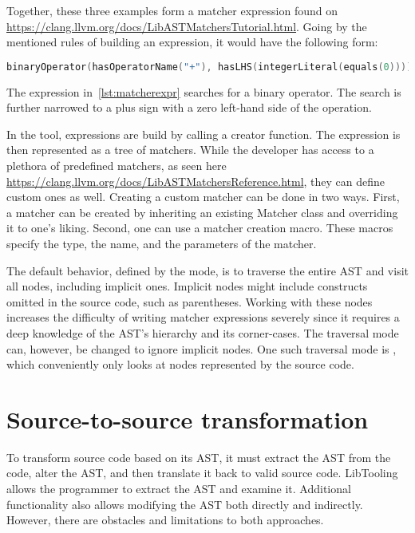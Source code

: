 Together, these three examples form a matcher expression found on 
\url{https://clang.llvm.org/docs/LibASTMatchersTutorial.html}. 
Going by the mentioned rules of building an expression, it would have 
the following form: 

\begin{lstlisting}[caption=Matcher expression., language=C++, 
label={lst:matcherexpr}, numbers=none]
binaryOperator(hasOperatorName("+"), hasLHS(integerLiteral(equals(0)))).
\end{lstlisting}

The expression in~\ref{lst:matcherexpr} searches for a binary operator. 
The search is further narrowed to a plus sign with a zero left-hand 
side of the operation.

In the tool, expressions are build by calling a creator function. 
The expression is then represented as a tree of matchers. 
While the developer has access to a plethora of predefined matchers, 
as seen here \url{https://clang.llvm.org/docs/LibASTMatchersReference.html}, 
they can define custom ones as well. 
Creating a custom matcher can be done in two ways. 
First, a matcher can be created by inheriting an existing Matcher class 
and overriding it to one's liking. 
Second, one can use a matcher creation macro. 
These macros specify the type, the name, and the parameters of the matcher.

The default behavior, defined by the  mode, is to traverse 
the entire AST and visit all nodes, including implicit ones. 
Implicit nodes might include constructs omitted in the source code, 
such as parentheses. 
Working with these nodes increases the difficulty of writing matcher 
expressions severely since it requires a deep knowledge of the AST's 
hierarchy and its corner-cases. 
The traversal mode can, however, be changed to ignore implicit nodes. 
One such traversal mode is , 
which conveniently only looks at nodes represented by the source code. 

\section{Source-to-source transformation}

To transform source code based on its AST, it must extract the AST 
from the code, alter the AST, and then translate it back to valid 
source code. 
LibTooling allows the programmer to extract the AST and examine it. 
Additional functionality also allows modifying the AST both directly 
and indirectly. 
However, there are obstacles and limitations to both approaches. 

